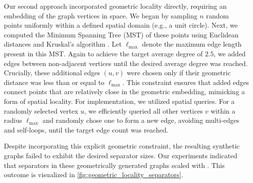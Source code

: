 Our second approach incorporated geometric locality directly, requiring an embedding of the graph vertices in space.
We began by sampling \(n\) random points uniformly within a defined spatial domain (e.g., a unit circle).
Next, we computed the Minimum Spanning Tree (MST) of these points using Euclidean distances and Kruskal's algorithm \cite{kruskal_shortest_1956}.
Let \( \ell_{\max} \) denote the maximum edge length present in this MST.
Again to achieve the target average degree of \(2.5\), we added edges between non-adjacent vertices until the desired average degree was reached.
Crucially, these additional edges \( (u, v) \) were chosen only if their geometric distance was less than or equal to \( \ell_{\max} \).
This constraint ensures that added edges connect points that are relatively close in the geometric embedding, mimicking a form of spatial locality.
For implementation, we utilized spatial queries.
For a randomly selected vertex \(u\), we efficiently queried all other vertices \(v\) within a radius \( \ell_{\max} \) and randomly chose one to form a new edge, avoiding multi-edges and self-loops, until the target edge count was reached.

Despite incorporating this explicit geometric constraint, the resulting synthetic graphs failed to exhibit the desired separator sizes.
Our experiments indicated that separators in these geometrically generated graphs scaled with .
This outcome is visualized in \cref{fig:geometric_locality_separators}.

